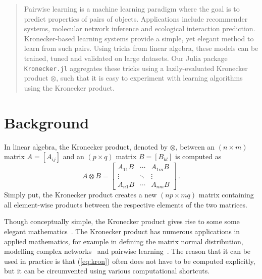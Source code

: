 \documentclass{juliacon}
\begin{document}


\maketitle

\begin{abstract}
Pairwise learning is a machine learning paradigm where the goal is to predict properties of pairs of objects.
Applications include recommender systems, molecular network inference and ecological interaction prediction.
Kronecker-based learning systems provide a simple, yet elegant method to learn from such pairs.
Using tricks from linear algebra, these models can be trained, tuned and validated on large datasets.
Our Julia package \texttt{Kronecker.jl} aggregates these tricks using a lazily-evaluated Kronecker product $\otimes$, such that it is easy to experiment with learning algorithms using the Kronecker product.

\end{abstract}

\section{Background}

In linear algebra, the Kronecker product, denoted by $\otimes$, between an $(n\times m)$ matrix $A=[A_{ij}]$ and an $(p\times q)$ matrix $B=[B_{kl}]$ is computed as
\begin{equation}\label{eq:kron}
  {A} \otimes  {B} ={\begin{bmatrix}A_{11} {B} &\cdots &A_{1m} {B} \\\vdots &\ddots &\vdots \\A_{n1} {B} &\cdots &A_{nm} {B} \end{bmatrix}}\,.
\end{equation}
Simply put, the Kronecker product creates a new $(np\times mq)$ matrix containing all element-wise products between the respective elements of the two matrices.

Though conceptually simple, the Kronecker product gives rise to some some elegant mathematics~\cite{Sch2013,VanLoan2000}.
The Kronecker product has numerous applications in applied mathematics, for example in defining the matrix normal distribution, modelling complex networks~\cite{Leskovec2008} and pairwise learning~\cite{Stock2017tskrr}.
The reason that it can be used in practice is that (\ref{eq:kron}) often does not have to be computed explicitly, but it can be circumvented using various computational shortcuts.
\end{document}

